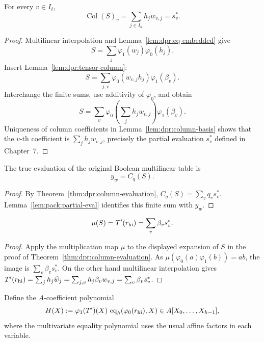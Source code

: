 \begin{theorem}\label{thm:dpr:column-evaluation}
For every $v\in I_\ell$,
\[
 \boxed{
 \operatorname{Col}(S)_v
  =\sum_{j\in I_h}h_jw_{v,j}
  =s_v^*.}
\]
\end{theorem}
\begin{proof}
Multilinear interpolation and
Lemma~\ref{lem:dpr:eq-embedded} give
\[
 S=\sum_j\varphi_1(\widehat w_j)
                 \varphi_0(h_j).
\]
Insert Lemma~\ref{lem:dpr:tensor-column}:
\[
 S=\sum_{j,v}\varphi_0(w_{v,j}h_j)
                       \varphi_1(\beta_v).
\]
Interchange the finite sums, use
additivity of $\varphi_0$, and obtain
\[
 S=\sum_v
     \varphi_0\left(\sum_jh_jw_{v,j}\right)
     \varphi_1(\beta_v).
\]
Uniqueness of column coefficients in
Lemma~\ref{lem:dpr:column-basis}
shows that the $v$-th coefficient
is $\sum_jh_jw_{v,j}$, precisely the
partial evaluation $s_v^*$ defined
in Chapter~7.
\end{proof}

\begin{theorem}\label{thm:dpr:claim-contraction}
The true evaluation of the original
Boolean multilinear table is
\[
 \boxed{y_w=C_q(S).}
\]
\end{theorem}
\begin{proof}
By Theorem~\ref{thm:dpr:column-evaluation},
$C_q(S)=\sum_vq_vs_v^*$.
Lemma~\ref{lem:pack:partial-eval}
identifies this finite sum with $y_w$.
\end{proof}

\begin{lemma}\label{lem:dpr:mu-evaluation}
\[
 \mu(S)=T'(r_{\rm hi})
       =\sum_v\beta_vs_v^*.
\]
\end{lemma}
\begin{proof}
Apply the multiplication map $\mu$
to the displayed expansion of $S$
in the proof of
Theorem~\ref{thm:dpr:column-evaluation}.
As $\mu(\varphi_0(a)\varphi_1(b))=ab$,
the image is $\sum_v\beta_vs_v^*$.
On the other hand multilinear
interpolation gives
$T'(r_{\rm hi})=\sum_jh_j\widehat w_j
=\sum_{j,v}h_j\beta_vw_{v,j}
=\sum_v\beta_vs_v^*$.
\end{proof}

\begin{definition}\label{def:dpr:H}
Define the $A$-coefficient polynomial
\[
 H(X):=\varphi_1(T')(X)\,
   \operatorname{eq}_h(\varphi_0(r_{\rm hi}),X)
 \in A[X_0,\ldots,X_{h-1}],
\]
where the multivariate equality polynomial
uses the usual affine factors in each variable.
\end{definition}

